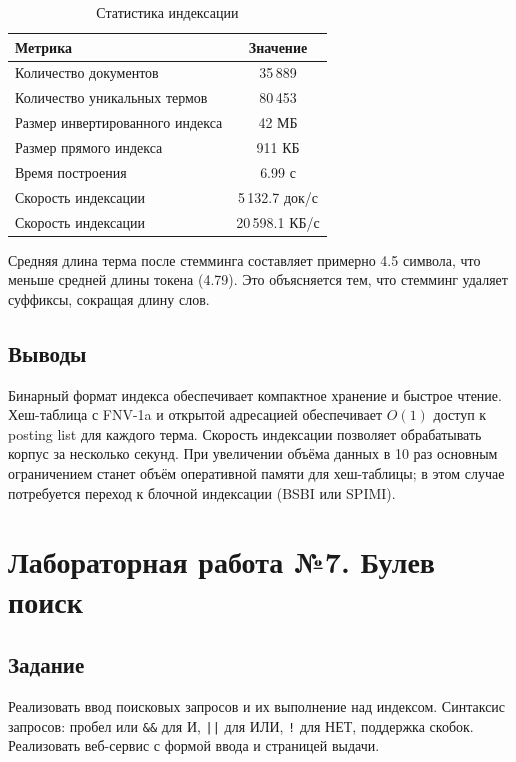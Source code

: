 \documentclass[a4paper,12pt]{article}
\begin{document}
\begin{table}[H]
\centering
\begin{tabular}{lc}
\toprule
\textbf{Метрика} & \textbf{Значение} \\
\midrule
Количество документов & 35\,889 \\
Количество уникальных термов & 80\,453 \\
Размер инвертированного индекса & 42 МБ \\
Размер прямого индекса & 911 КБ \\
Время построения & 6.99 с \\
Скорость индексации & 5\,132.7 док/с \\
Скорость индексации & 20\,598.1 КБ/с \\
\bottomrule
\end{tabular}
\caption{Статистика индексации}
\label{tab:index_stats}
\end{table}

Средняя длина терма после стемминга составляет примерно 4.5 символа, что меньше средней 
длины токена (4.79). Это объясняется тем, что стемминг удаляет суффиксы, сокращая 
длину слов.

\subsection{Выводы}
Бинарный формат индекса обеспечивает компактное хранение и быстрое чтение. Хеш-таблица 
с FNV-1a и открытой адресацией обеспечивает $O(1)$ доступ к posting list для каждого терма. 
Скорость индексации позволяет обрабатывать корпус за несколько секунд. При увеличении 
объёма данных в 10 раз основным ограничением станет объём оперативной памяти для хеш-таблицы; 
в этом случае потребуется переход к блочной индексации (BSBI или SPIMI).

\newpage

\section{Лабораторная работа №7. Булев поиск}

\subsection{Задание}
Реализовать ввод поисковых запросов и их выполнение над индексом. Синтаксис запросов: 
пробел или \texttt{\&\&} для И, \texttt{||} для ИЛИ, \texttt{!} для НЕТ, поддержка скобок. 
Реализовать веб-сервис с формой ввода и страницей выдачи.
\end{document}
